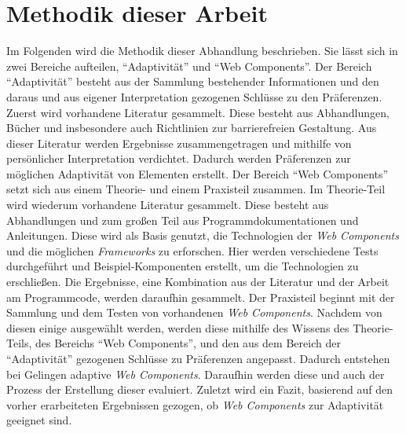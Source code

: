 \documentclass[12pt, paper=a4, bibtotoc, toc=listof, headsepline=true]{scrreprt}
\begin{document}
\chapter{Methodik dieser Arbeit}
Im Folgenden wird die Methodik dieser Abhandlung beschrieben. Sie lässt sich in zwei Bereiche aufteilen, \enquote{Adaptivität} und \enquote{Web Components}.
Der Bereich \enquote{Adaptivität} besteht aus der Sammlung bestehender Informationen und den daraus und aus eigener Interpretation gezogenen Schlüsse zu den Präferenzen. Zuerst wird vorhandene Literatur gesammelt. Diese besteht aus Abhandlungen, Bücher und insbesondere auch Richtlinien zur barrierefreien Gestaltung. Aus dieser Literatur werden Ergebnisse zusammengetragen und mithilfe von persönlicher Interpretation verdichtet. Dadurch werden Präferenzen zur möglichen Adaptivität von Elementen erstellt. 
\newline
Der Bereich \enquote{Web Components} setzt sich aus einem Theorie- und einem Praxisteil zusammen. Im Theorie-Teil wird wiederum vorhandene Literatur gesammelt. Diese besteht aus Abhandlungen und zum großen Teil aus Programmdokumentationen und Anleitungen. Diese wird als Basis genutzt, die Technologien der \emph{Web Components} und die möglichen \emph{Frameworks} zu erforschen. Hier werden verschiedene Tests durchgeführt und Beispiel-Komponenten erstellt, um die Technologien zu erschließen. Die Ergebnisse, eine Kombination aus der Literatur und der Arbeit am Programmcode, werden daraufhin gesammelt. Der Praxisteil beginnt mit der Sammlung und dem Testen von vorhandenen \emph{Web Components}. Nachdem von diesen einige ausgewählt werden, werden diese mithilfe des Wissens des Theorie-Teils, des Bereichs \enquote{Web Components}, und den aus dem Bereich der \enquote{Adaptivität} gezogenen Schlüsse zu Präferenzen angepasst. Dadurch entstehen bei Gelingen adaptive \emph{Web Components}. Daraufhin werden diese und auch der Prozess der Erstellung dieser evaluiert. Zuletzt wird ein Fazit, basierend auf den vorher erarbeiteten Ergebnissen gezogen, ob \emph{Web Components} zur Adaptivität geeignet sind. 
\end{document}
